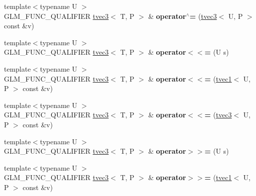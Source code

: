 \begin{DoxyCompactItemize}
\item 
\hypertarget{structglm_1_1tvec3_aaf5a7e57c8fe6292695624a42b69c339}{{\footnotesize template$<$typename U $>$ }\\G\-L\-M\-\_\-\-F\-U\-N\-C\-\_\-\-Q\-U\-A\-L\-I\-F\-I\-E\-R \hyperlink{structglm_1_1tvec3}{tvec3}$<$ T, P $>$ \& {\bfseries operator$^\wedge$=} (\hyperlink{structglm_1_1tvec3}{tvec3}$<$ U, P $>$ const \&v)}\label{structglm_1_1tvec3_aaf5a7e57c8fe6292695624a42b69c339}

\item 
\hypertarget{structglm_1_1tvec3_a739bb08ec1f816caa1da09d2d125fbef}{{\footnotesize template$<$typename U $>$ }\\G\-L\-M\-\_\-\-F\-U\-N\-C\-\_\-\-Q\-U\-A\-L\-I\-F\-I\-E\-R \hyperlink{structglm_1_1tvec3}{tvec3}$<$ T, P $>$ \& {\bfseries operator$<$$<$=} (U s)}\label{structglm_1_1tvec3_a739bb08ec1f816caa1da09d2d125fbef}

\item 
\hypertarget{structglm_1_1tvec3_a3eadadf25a3ef2e34bb1b6b7f192384a}{{\footnotesize template$<$typename U $>$ }\\G\-L\-M\-\_\-\-F\-U\-N\-C\-\_\-\-Q\-U\-A\-L\-I\-F\-I\-E\-R \hyperlink{structglm_1_1tvec3}{tvec3}$<$ T, P $>$ \& {\bfseries operator$<$$<$=} (\hyperlink{structglm_1_1tvec1}{tvec1}$<$ U, P $>$ const \&v)}\label{structglm_1_1tvec3_a3eadadf25a3ef2e34bb1b6b7f192384a}

\item 
\hypertarget{structglm_1_1tvec3_a7c12511c3769c0e7822bc884af40f3a2}{{\footnotesize template$<$typename U $>$ }\\G\-L\-M\-\_\-\-F\-U\-N\-C\-\_\-\-Q\-U\-A\-L\-I\-F\-I\-E\-R \hyperlink{structglm_1_1tvec3}{tvec3}$<$ T, P $>$ \& {\bfseries operator$<$$<$=} (\hyperlink{structglm_1_1tvec3}{tvec3}$<$ U, P $>$ const \&v)}\label{structglm_1_1tvec3_a7c12511c3769c0e7822bc884af40f3a2}

\item 
\hypertarget{structglm_1_1tvec3_aa8115e71689a7096d0e6e0e4ab721db2}{{\footnotesize template$<$typename U $>$ }\\G\-L\-M\-\_\-\-F\-U\-N\-C\-\_\-\-Q\-U\-A\-L\-I\-F\-I\-E\-R \hyperlink{structglm_1_1tvec3}{tvec3}$<$ T, P $>$ \& {\bfseries operator$>$$>$=} (U s)}\label{structglm_1_1tvec3_aa8115e71689a7096d0e6e0e4ab721db2}

\item 
\hypertarget{structglm_1_1tvec3_a2f08b19372b6573b24cb81ed5657f8a3}{{\footnotesize template$<$typename U $>$ }\\G\-L\-M\-\_\-\-F\-U\-N\-C\-\_\-\-Q\-U\-A\-L\-I\-F\-I\-E\-R \hyperlink{structglm_1_1tvec3}{tvec3}$<$ T, P $>$ \& {\bfseries operator$>$$>$=} (\hyperlink{structglm_1_1tvec1}{tvec1}$<$ U, P $>$ const \&v)}\label{structglm_1_1tvec3_a2f08b19372b6573b24cb81ed5657f8a3}


\end{DoxyCompactItemize}
